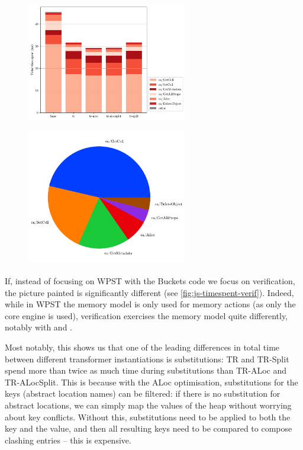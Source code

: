 \begin{figure}
\captionsetup{width=.4\linewidth}
\centering
\begin{minipage}[t]{.45\textwidth}
	\centering
	\includegraphics[width=7cm]{figures/js/buckets_time_spent_per_action_detailed.pdf}
	\label{fig:js-timespent-buckets}
\end{minipage}\hfill%
\begin{minipage}[t]{.45\textwidth}
	\centering
	\includegraphics[width=7cm]{figures/js/buckets_avg_action_call_count.pdf}
	\label{fig:js-callcount-buckets}
\end{minipage}%
\end{figure}

If, instead of focusing on WPST with the Buckets code we focus on verification, the picture painted is significantly different (see \autoref{fig:js-timespent-verif}). Indeed, while in WPST the memory model is only used for memory actions (as only the core engine is used), verification exercises the memory model quite differently, notably with \produce{} and \consume{}.

Most notably, this shows us that one of the leading differences in total time between different transformer instantiations is substitutions: TR and TR-Split spend more than twice as much time during substitutions than TR-ALoc and TR-ALocSplit. This is because with the ALoc optimisation, substitutions for the keys (abstract location names) can be filtered: if there is no substitution for abstract locations, we can simply map the values of the heap without worrying about key conflicts. Without this, substitutions need to be applied to both the key and the value, and then all resulting keys need to be compared to compose clashing entries -- this is expensive.

